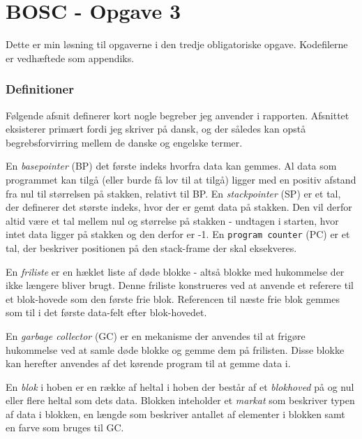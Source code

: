 \documentclass{article}
\begin{document}
\section*{BOSC - Opgave 3}
Dette er min løsning til opgaverne i den tredje obligatoriske opgave. Kodefilerne er vedhæftede som appendiks. 

\subsubsection*{Definitioner}
Følgende afsnit definerer kort nogle begreber jeg anvender i rapporten. Afsnittet eksisterer primært fordi jeg skriver på dansk, og der således kan opstå begrebsforvirring mellem de danske og engelske termer.

En \textit{basepointer} (BP) det første indeks hvorfra data kan gemmes. Al data som programmet kan tilgå (eller burde få lov til at tilgå) ligger med en positiv afstand fra nul til størrelsen på stakken, relativt til BP. En \textit{stackpointer} (SP) er et tal, der definerer det største indeks, hvor der er gemt data på stakken. Den vil derfor altid være et tal mellem nul og størrelse på stakken - undtagen i starten, hvor intet data ligger på stakken og den derfor er -1. En \texttt{program counter} (PC) er et tal, der beskriver positionen på den stack-frame der skal eksekveres.

En \textit{friliste} er en hæklet liste af døde blokke - altså blokke med hukommelse der ikke længere bliver brugt. Denne friliste konstrueres ved at anvende et referere til et blok-hovede som den første frie blok. Referencen til næste frie blok gemmes som til i det første data-felt efter blok-hovedet. 

En \textit{garbage collector} (GC) er en mekanisme der anvendes til at frigøre hukommelse ved at samle døde blokke og gemme dem på frilisten. Disse blokke kan herefter anvendes af det kørende program til at gemme data i.

En \textit{blok} i hoben er en række af heltal i hoben der består af et \textit{blokhoved} på og nul eller flere heltal som dets data. Blokken inteholder et \textit{markat} som beskriver typen af data i blokken, en længde som beskriver antallet af elementer i blokken samt en farve som bruges til GC.
\end{document}

